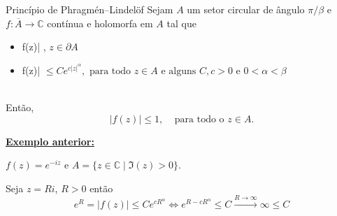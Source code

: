 \documentclass{beamer}
\begin{document}
\begin{frame}{}

\begin{block}{Princípio de Phragmén–Lindelöf}
Sejam $A$ um setor circular de ângulo $\pi / \beta$ e $f:\overline{A} \rightarrow \mathbb{C}$ contínua e holomorfa em $A$ tal que 
\begin{itemize}
    \item \vert f(z)|  ,  $z \in \partial A$
    \item \vert f(z)|  $\leq Ce^{c|z|^\alpha}, \text{ para todo } z \in A \text{ e alguns } C,c>0 $
    e $0<\alpha<\beta$
\end{itemize}\\

Então, $$|f (z)| \leq 1, \;\;\;\; \text{para todo o } z \in A.$$
\end{block}


\underline{\textbf{Exemplo anterior:}}

\vspace{0.2cm}

$f(z)=e^{-iz} \text { e } A=\{z \in \mathbb{C}\mid \Im{(z)} >0 \}$.

Seja $z=Ri$, $R>0$ então $$e^R=|f(z)| \leq Ce^{cR^\alpha} \Leftrightarrow e^{R-cR^\alpha} \leq  C \xrightarrow{R \to \infty} \infty \leq C$$

\end{frame}
\end{document}
